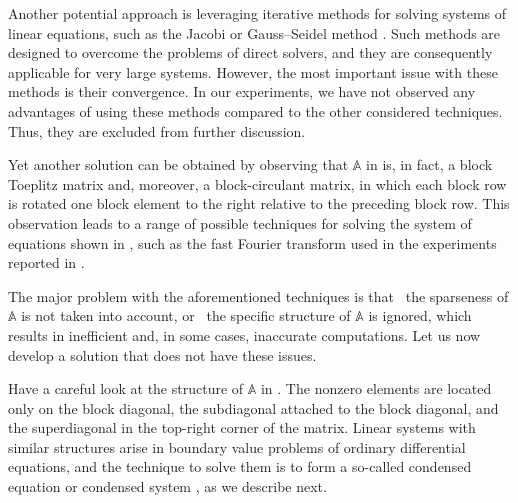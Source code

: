 Another potential approach is leveraging iterative methods for solving systems
of linear equations, such as the Jacobi or Gauss--Seidel method
\cite{press2007}. Such methods are designed to overcome the problems of direct
solvers, and they are consequently applicable for very large systems. However,
the most important issue with these methods is their convergence. In our
experiments, we have not observed any advantages of using these methods compared
to the other considered techniques. Thus, they are excluded from further
discussion.

Yet another solution can be obtained by observing that $\mathbb{A}$ in
 is, in fact, a block Toeplitz matrix and, moreover,
a block-circulant matrix, in which each block row is rotated one block element
to the right relative to the preceding block row. This observation leads to a
range of possible techniques for solving the system of equations shown in
, such as the fast Fourier transform
\cite{mazancourt1983} used in the experiments reported in
.

The major problem with the aforementioned techniques is that \one~the sparseness
of $\mathbb{A}$ is not taken into account, or \two~the specific structure of
$\mathbb{A}$ is ignored, which results in inefficient and, in some cases,
inaccurate computations. Let us now develop a solution that does not have these
issues.

Have a careful look at the structure of $\mathbb{A}$ in
. The nonzero elements are located only on the block
diagonal, the subdiagonal attached to the block diagonal, and the superdiagonal
in the top-right corner of the matrix. Linear systems with similar structures
arise in boundary value problems of ordinary differential equations, and the
technique to solve them is to form a so-called condensed equation or condensed
system \cite{stoer2002}, as we describe next.


